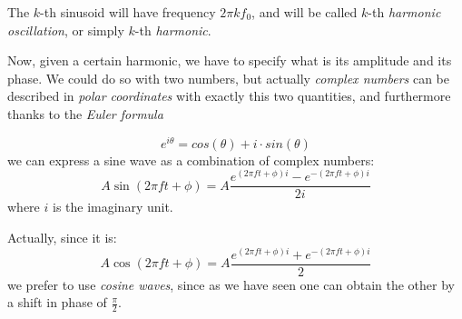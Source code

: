 The $k$-th sinusoid will have frequency $2 \pi k f_0$, and will be called $k$-th \emph{harmonic oscillation}, or simply $k$-th \emph{harmonic}.

Now, given a certain harmonic, we have to specify what is its amplitude and its phase. We could do so with two numbers, but actually \emph{complex numbers} can be described in \emph{polar coordinates} with exactly this two quantities, and furthermore thanks to the \emph{Euler formula} 

\begin{equation}
    e^{i \theta} = cos(\theta) + i \cdot sin (\theta)
\end{equation}
we can express a sine wave as a combination of complex numbers:
\begin{equation}
    A \sin(2 \pi f t + \phi) = A \frac{e^{(2 \pi f t + \phi) i} - e^{-(2 \pi f t + \phi) i}}{2 i}
\end{equation}
where $i$ is the imaginary unit.

Actually, since it is:
\begin{equation}
    A \cos(2 \pi f t + \phi) = A \frac{e^{(2 \pi f t + \phi) i} + e^{-(2 \pi f t + \phi) i}}{2}
\end{equation}
we prefer to use \emph{cosine waves}, since as we have seen one can obtain the other by a shift in phase of $\frac{\pi}{2}$.


